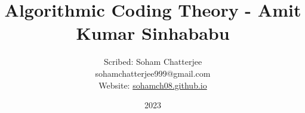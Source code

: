 \documentclass{report}
\title{\huge Algorithmic Coding Theory - Amit Kumar Sinhababu}
\author{ \vspace*{5mm} \LARGE Scribed: Soham Chatterjee\\\large sohamchatterjee999@gmail.com\\ \large Website: \href{https://sohamch08.github.io/}{sohamch08.github.io}}
\date{\LARGE 2023}
\begin{document}
\begin{titlingpage}
	\maketitle
\end{titlingpage}
	
\pagebreak
\tableofcontents 
\pagebreak





\pagebreak
\printbibliography
%
%
\end{document}
